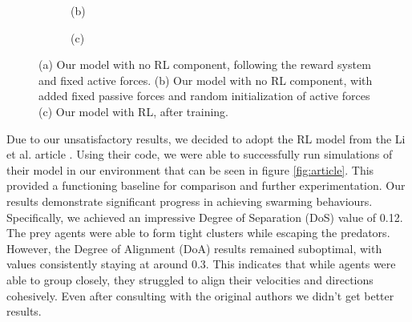\documentclass[9pt]{pnas-new}
\begin{document}
\begin{figure}[ht]
\begin{subfigure}{0.30\textwidth}
			\vspace{0.5em}
			\centering (b)
		\end{subfigure}
		\hfill
		\begin{subfigure}{0.30\textwidth}
			\centering
			\vspace{0.5em}
			\centering (c)
		\end{subfigure}
		
		\caption{(a) Our model with no RL component, following the reward system and fixed active forces. (b) Our model with no RL component, with added fixed passive forces and random initialization of active forces (c) Our model with RL, after training.}
		\label{fig:three_images}
	\end{figure}
	
	Due to our unsatisfactory results, we decided to adopt the RL model from the Li et al. article \cite{li2023predator}.
	Using their code, we were able to successfully run simulations of their model in our environment that can be seen in figure \ref{fig:article}. 
	This provided a functioning baseline for comparison and further experimentation.
	Our results demonstrate significant progress in achieving swarming behaviours. 
	Specifically, we achieved an impressive Degree of Separation (DoS) value of 0.12.
	The prey agents were able to form tight clusters while escaping the predators.
	However, the Degree of Alignment (DoA) results remained suboptimal, with values consistently staying at around 0.3.
	This indicates that while agents were able to group closely, they struggled to align their velocities and directions cohesively. 
	Even after consulting with the original authors we didn't get better results.
	
\end{document}

